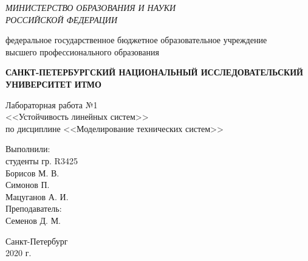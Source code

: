 \begin{titlepage}
    \begin{center}
        \textit{МИНИСТЕРСТВО ОБРАЗОВАНИЯ И НАУКИ\\
        РОССИЙСКОЙ ФЕДЕРАЦИИ}
        \vspace{1ex}

        федеральное государственное бюджетное образовательное учреждение\\
        высшего профессионального образования
        \vspace{1ex}

        \textbf{САНКТ-ПЕТЕРБУРГСКИЙ НАЦИОНАЛЬНЫЙ ИССЛЕДОВАТЕЛЬСКИЙ УНИВЕРСИТЕТ ИТМО}
        \vspace{13ex}

        Лабораторная работа №1\\
        <<Устойчивость линейных систем>>\\
        по дисциплине <<Моделирование технических систем>>\\
    \end{center}
    \vspace{15em}
    \begin{flushright}
        \noindent
        Выполнили:\\
        студенты гр. R3425\\
        Борисов М. В.\\
        Симонов П.\\
        Мацуганов А. И.\\
        Преподаватель:\\
        Семенов Д. М.
    \end{flushright}
    \vfill
    \begin{center}
        \large{Санкт-Петербург}\\
        2020 г.\\
    \end{center}
\end{titlepage}
